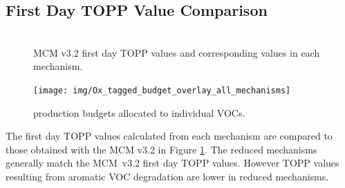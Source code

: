 
\subsection{First Day TOPP Value Comparison} \label{ss:day1} %

\begin{figure}
    \centering
    \includegraphics[width=\textwidth]{img/first_day_values}
    \vspace{0mm}
    \caption{MCM v3.2 first day TOPP values and corresponding values in each mechanism.}
    \vspace{-4mm}
    \label{f:first_day}
\end{figure}

\begin{figure}
    \centering
    \texttt{[image: img/Ox\_tagged\_budget\_overlay\_all\_mechanisms]}
    \vspace{0mm}
    \caption{ production budgets allocated to individual VOCs.}
    \vspace{-4mm}
    \label{f:Ox_tagged_budgets}
\end{figure}

The first day TOPP values calculated from each mechanism are compared to those obtained with the MCM v3.{2} in Figure \ref{f:first_day}. 
The reduced mechanisms generally match the \mbox{MCM v3.2} first day TOPP values. 
However TOPP values resulting from aromatic VOC degradation are lower in reduced mechanisms.

